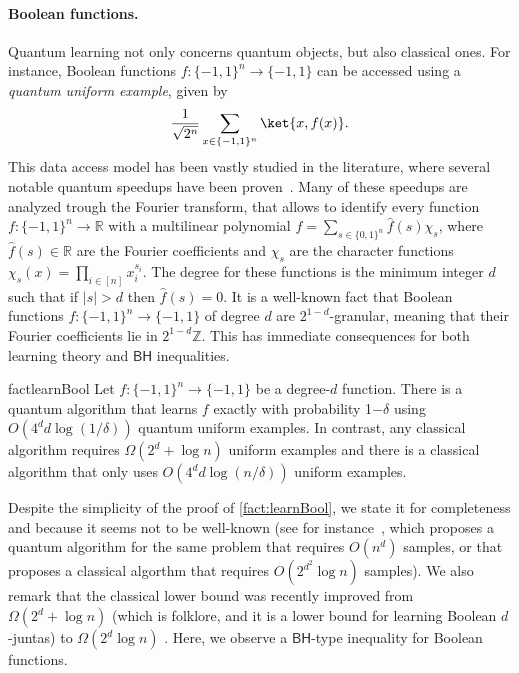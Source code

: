 \documentclass[11pt]{article}
\newcommand{\BH}{\textsf{BH}}
\theoremstyle{plain}
\theoremstyle{plain}
\theoremstyle{definition}
\theoremstyle{remark}
\theoremstyle{named}
\begin{document}
\paragraph{Boolean functions.} Quantum learning not only concerns quantum objects, but also classical ones. For instance, Boolean functions
 $f:\{-1,1\}^n\to \{-1,1\}$ can be accessed using a \emph{quantum uniform example}, given by 
 \begin{equation}\label{eq:quantumsamples}
     \frac{1}{\sqrt{2^n}}\sum_{x\in \{-1,1\}^n}\ket{x,f(x)}.
 \end{equation} 
This data access model has been vastly studied in the literature, where several notable quantum speedups have been proven~\cite{bshouty1995learning,atici2007quantum,arunachalam2021two}. Many of these speedups are analyzed trough the Fourier transform, that allows to identify every function $f:\{-1,1\}^n\to\mathbb R$ with a multilinear polynomial  $f=\sum_{s\in \{0,1\}^n}\widehat f(s)\chi_s$, 
where $\widehat f(s)\in \mathbb R$ are the Fourier coefficients and $\chi_s$ are the character functions $\chi_s(x)=\prod_{i\in [n]}x_i^{s_i}$. The degree for these functions is the minimum integer $d$ such that if $|s|>d$ then $\widehat f(s)=0$. It is a well-known fact that Boolean functions $f:\{-1,1\}^n\to \{-1,1\}$ of degree $d$ are $2^{1-d}$-granular, meaning that their Fourier coefficients lie in $2^{1-d}\mathbb Z$. This has immediate consequences for both learning theory and $\BH$ inequalities. 
\begin{restatable}{fact}{learnBool}\label{fact:learnBool}
   Let $f:\{-1,1\}^n\to\{-1,1\}$ be a degree-$d$ function. There is a quantum algorithm that learns $f$ exactly  with probability 1$-\delta$ using $O\left(4^dd\log\left(1/\delta\right)\right)$ quantum uniform examples. In contrast, any classical algorithm requires $\Omega(2^d+\log n)$ uniform examples and there is a classical algorithm that only uses $O\left(4^dd\log\left(n/\delta\right)\right)$ uniform examples.
\end{restatable}
Despite the simplicity of the proof of \cref{fact:learnBool}, we state it for completeness and because it seems not to be well-known (see for instance~\cite[Corollary 34]{nadimpalli2023pauli}, which proposes a quantum algorithm for the same problem that requires $O(n^d)$ samples, or \cite[Corollary 4]{eskenazis2022low} that proposes a classical algorthm that requires $O(2^{d^2}\log n)$ samples). We also remark that the classical lower bound was recently improved from $\Omega(2^d+\log n)$ (which is folklore, and it is a lower bound for learning Boolean $d$-juntas) to $\Omega(2^d\log n)$ \cite{eskenazis2022low}.  Here, we observe a $\BH$-type inequality for Boolean functions.
\end{document}
